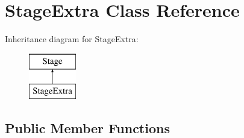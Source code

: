 \hypertarget{class_stage_extra}{
\section{StageExtra Class Reference}
\label{class_stage_extra}
}
Inheritance diagram for StageExtra:\begin{figure}[H]
\begin{center}
\leavevmode
\includegraphics[height=2.000000cm]{class_stage_extra}
\end{center}
\end{figure}
\subsection*{Public Member Functions}

